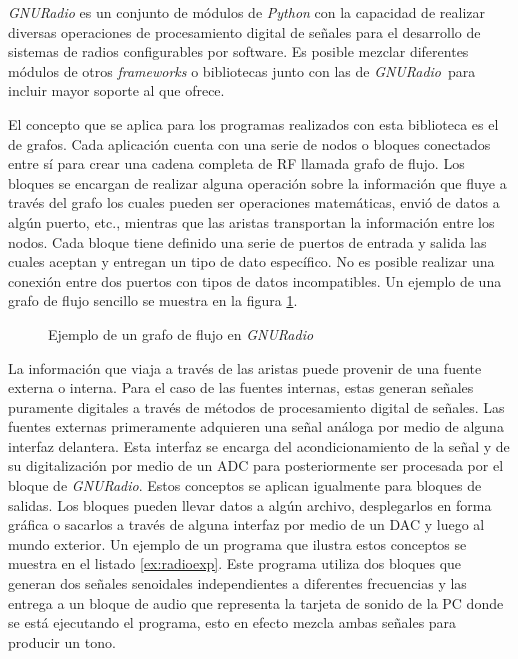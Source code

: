 \emph{GNURadio} es un conjunto de m\'odulos de \emph{Python} con la capacidad de
realizar diversas operaciones de procesamiento digital de se\~nales para el desarrollo de
sistemas de radios configurables por software. Es posible mezclar diferentes
m\'odulos de otros \emph{frameworks} o bibliotecas junto con las de \emph{GNURadio}\
para incluir mayor soporte al que ofrece.

El concepto que se aplica para los programas realizados con esta biblioteca es
el de grafos. Cada aplicaci\'on cuenta con una serie de nodos o bloques
conectados entre s\'i para crear una cadena completa de RF llamada grafo de
flujo. Los bloques se encargan de realizar alguna operaci\'on sobre la
informaci\'on que fluye a trav\'es del grafo los cuales pueden ser operaciones
matem\'aticas, envi\'o de datos a alg\'un puerto, etc., mientras que las aristas
transportan la informaci\'on entre los nodos. Cada bloque tiene definido una
serie de puertos de entrada y salida las cuales aceptan y entregan un tipo de
dato espec\'ifico. No es posible realizar una conexi\'on entre dos puertos con
tipos de datos incompatibles. Un ejemplo de una grafo de flujo sencillo se
muestra en la figura \ref{fig:radioflow}.

\begin{figure}[hpt]
  \centering
  \vspace{0.3in}
	\vspace{0.5in}
	\caption{Ejemplo de un grafo de flujo en \emph{GNURadio}}
	\label{fig:radioflow}
\end{figure}

La informaci\'on que viaja a trav\'es de las aristas puede provenir de una fuente externa o interna. Para el caso de las fuentes
internas, estas generan se\~nales puramente digitales a trav\'es de m\'etodos de procesamiento digital de se\~nales. Las fuentes
externas primeramente adquieren una se\~nal an\'aloga por medio de alguna interfaz delantera. Esta interfaz se encarga del
 acondicionamiento de la se\~nal y de su digitalizaci\'on por medio de un ADC para posteriormente ser procesada por el bloque de
\emph{GNURadio}. Estos conceptos se aplican igualmente para bloques de salidas. Los bloques pueden llevar datos a alg\'un archivo,
desplegarlos en forma gr\'afica o sacarlos a trav\'es de alguna interfaz por medio de un DAC y luego al mundo exterior.
Un ejemplo de un programa que ilustra estos conceptos se muestra en el listado \ref{ex:radioexp}. Este programa utiliza dos
bloques que generan dos se\~nales senoidales independientes a diferentes frecuencias y las entrega a un bloque de audio que
representa la tarjeta de sonido de la PC donde se est\'a ejecutando el programa, esto en efecto mezcla ambas se\~nales para
producir un tono.

